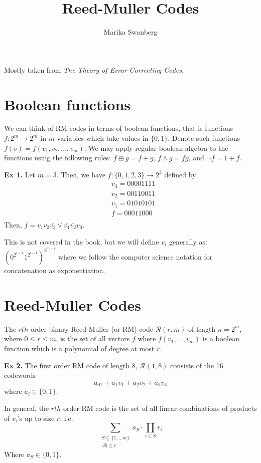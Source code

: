 \documentclass[12pt]{article}
\author{Marika Swanberg}
\title{Reed-Muller Codes}
\date{}
\begin{document}
\maketitle
Mostly taken from \textit{The Theory of Error-Correcting Codes}.
\section{Boolean functions}
We can think of RM codes in terms of boolean functions, that is functions $f: 2^m \rightarrow 2^m$ in $m$ variables which take values in $\{0,1\}$. Denote such functions $f(v) = f(v_1, v_2, \ldots , v_m)$. We may apply regular boolean algebra to the functions using the following rules: $f \oplus g = f + g$, $f \land g = fg$, and $\lnot f = 1 + f$.
\bigskip

\textbf{Ex 1.} Let $m = 3$. Then, we have $f: \{0,1,2,3\} \rightarrow 2^3$ defined by
\begin{align*}
& v_3 = 00001111 \\
& v_2 = 00110011 \\
& v_1 = 01010101 \\
& f = 00011000 \\
\end{align*}
Then, $f = v_1v_2\bar{v_3} \lor \bar{v_1}\bar{v_2}v_3$.

\bigskip

This is not covered in the book, but we will define $v_i$ generally as:
$(0^{2^{i-1}}1^{2^{i-1}})^{2^{m-i}}$ where we follow the computer science notation for  concatenation as exponentiation.

\section{Reed-Muller Codes}
The $rth$ order binary Reed-Muller (or RM) code $\mathscr{R}(r,m)$ of length $n = 2^m$, where $0 \leq r \leq m$, is the set of all vectors $f$ where $f(v_1, \ldots, v_m)$ is a boolean function which is a polynomial of degree at most $r$.

\bigskip

\textbf{Ex 2.} The first order RM code of length 8, $\mathscr{R}(1, 8)$ consists of the 16 codewords $$a_01 + a_1v_1 + a_2v_2 + a_3v_3$$ where $a_i \in \{0,1\}$.

In general, the $rth$ order RM code is the set of all linear combinations of products of $v_i$'s up to size $r$, i.e.
$$
\sum_{\substack{ S \subseteq \{1, \ldots m\}\\ |S| \leq r}} a_S \cdot  \prod_{i \in S} v_{i}
$$
Where $a_S \in \{0,1\}$.
\end{document}
